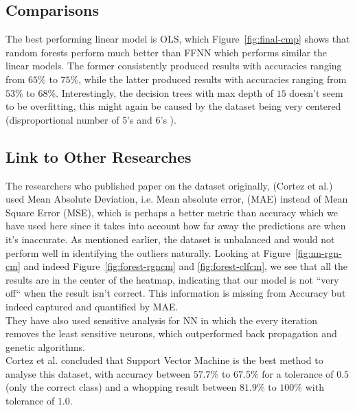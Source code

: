 \documentclass[english,notitlepage,reprint,nofootinbib]{revtex4-1}
\begin{document}
\subsection{Comparisons}
The best performing linear model is OLS, which 
Figure~\ref{fig:final-cmp} shows that random forests perform much better than FFNN which performs similar the linear models. The former consistently produced results with accuracies ranging from $ 65\% $ to $ 75\% $, while the latter produced results with accuracies ranging from $ 53\% $ to $ 68\% $. Interestingly, the decision trees with max depth of $ 15 $ doesn't seem to be overfitting, this might again be caused by the dataset being very centered (disproportional number of 5's and 6's ).

\subsection{Link to Other Researches}
The researchers who published paper on the dataset originally, (Cortez et al.) used Mean Absolute Deviation, i.e. Mean absolute error, (MAE) instead of Mean Square Error (MSE), which is perhaps a better metric than accuracy which we have used here since it takes into account how far away the predictions are when it's inaccurate. As mentioned earlier, the dataset is unbalanced and would not perform well in identifying the outliers naturally. Looking at Figure~\ref{fig:nn-rgn-cm} and indeed Figure~\ref{fig:forest-rgncm} and \ref{fig:forest-clfcm}, we see that all the results are in the center of the heatmap, indicating that our model is not ``very off`` when the result isn't correct. This information is missing from Accuracy but indeed captured and quantified by MAE. \\

They have also used sensitive analysis for NN in which the every iteration removes the least sensitive neurons, which outperformed back propagation and genetic algorithms. \\

Cortez et al. concluded that Support Vector Machine is the best method to analyse this dataset, with accuracy between $57.7\%$ to $67.5\%$ for a tolerance of $ 0.5 $ (only the correct class) and a whopping result between $ 81.9\% $ to $100\%$ with tolerance of $ 1.0 $. \cite{CORTEZ2009547}
\end{document}
